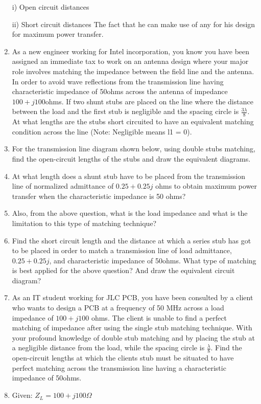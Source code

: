 \begin{ExerciseList}
\begin{enumerate}
i) Open circuit distances


ii) Short circuit distances
The fact that he can make use of any for his design for maximum power transfer.

\item As a new engineer working for Intel incorporation, you know you have been assigned an immediate tax to work on an antenna design where your major role involves matching the impedance between the field line and the antenna. In order to avoid wave reflections from the transmission line having characteristic impedance of 50ohms across the antenna of impedance  \(100+j100\)ohms. If two shunt stubs are placed on the line where the distance between the load and the first stub is negligible and the spacing circle is \(\frac{3\lambda}{8}\). At what lengths are the stubs short circuited to have an equivalent matching condition across the line (Note: Negligible means l1 = 0).
\item For the transmission line diagram shown below, using double stubs matching, find the open-circuit lengths of the stubs and draw the equivalent diagrams.
\item At what length does a shunt stub have to be placed from the transmission line of normalized admittance of \(0.25 + 0.25j\) ohms to obtain maximum power transfer when the characteristic impedance is 50 ohms?
\item Also, from the above question, what is the load impedance and what is the limitation to this type of matching technique?
\item Find the short circuit length and the distance at which a series stub has got to be placed in order to match a transmission line of load admittance, \(0.25 + 0.25j\), and characteristic impedance of 50ohms. What type of matching is best applied for the above question? And draw the equivalent circuit diagram?

\item As an IT student working for JLC PCB, you have been consulted by a client who wants to design a PCB at a frequency of 50 MHz across a load impedance of \(100 + j100\) ohms. The client is unable to find a perfect matching of impedance after using the single stub matching technique. With your profound knowledge of double stub matching and by placing the stub at a negligible distance from the load, while the spacing circle is \(\frac{\lambda}{8}\). Find the open-circuit lengths at which the clients stub must be situated to have perfect matching across the transmission line having a characteristic impedance of 50ohms.
\item Given: $Z_L = 100 + j100 \varOmega$



\end{enumerate}
\end{ExerciseList}
